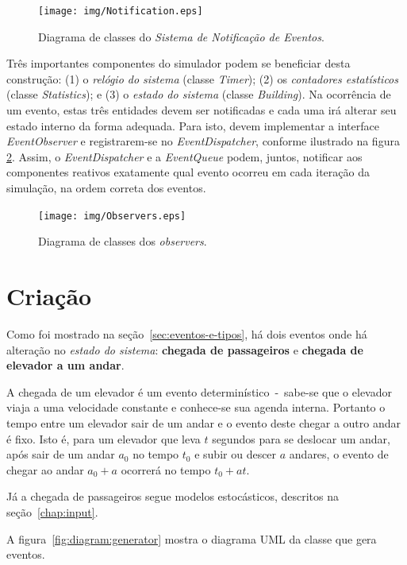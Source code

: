 \begin{figure}[htb!]
  \centering
  \texttt{[image: img/Notification.eps]}
  \caption{Diagrama de classes do \textit{Sistema de Notificação de Eventos}.}
\label{fig:diagram:notification}
\end{figure}

Três importantes componentes do simulador podem se beneficiar desta construção:
(1) o \textit{relógio do sistema} (classe \textit{Timer}); (2) os
\textit{contadores estatísticos} (classe \textit{Statistics}); e (3) o
\textit{estado do sistema} (classe \textit{Building}). Na ocorrência de um
evento, estas três entidades devem ser notificadas e cada uma irá alterar seu
estado interno da forma adequada. Para isto, devem implementar a interface
\textit{EventObserver} e registrarem-se no \textit{EventDispatcher}, conforme
ilustrado na figura \ref{fig:diagram:observers}. Assim, o
\textit{EventDispatcher} e a \textit{EventQueue} podem, juntos, notificar aos
componentes reativos exatamente qual evento ocorreu em cada iteração da
simulação, na ordem correta dos eventos.

\begin{figure}[htb!]
  \centering
  \texttt{[image: img/Observers.eps]}
  \caption{Diagrama de classes dos \textit{observers}.}
\label{fig:diagram:observers}
\end{figure}

\section{\label{sec:model:generator}Criação}

Como foi mostrado na seção~\ref{sec:eventos-e-tipos}, há dois eventos onde há
alteração no \textit{estado do sistema}: \textbf{chegada de passageiros} e
\textbf{chegada de elevador a um andar}.

A chegada de um elevador é um evento determinístico~-~sabe-se que o elevador
viaja a uma velocidade constante e conhece-se sua agenda interna. Portanto o
tempo entre um elevador sair de um andar e o evento deste chegar a outro andar é
fixo. Isto é, para um elevador que leva $t$ segundos para se deslocar um andar,
após sair de um andar $a_{0}$ no tempo $t_{0}$ e subir ou descer $a$ andares, o evento
de chegar ao andar $a_{0} + a$ ocorrerá no tempo $t_{0} + at$.

Já a chegada de passageiros segue modelos estocásticos, descritos na seção~\ref{chap:input}.

A figura~\ref{fig:diagram:generator} mostra o diagrama UML da classe que gera eventos.

